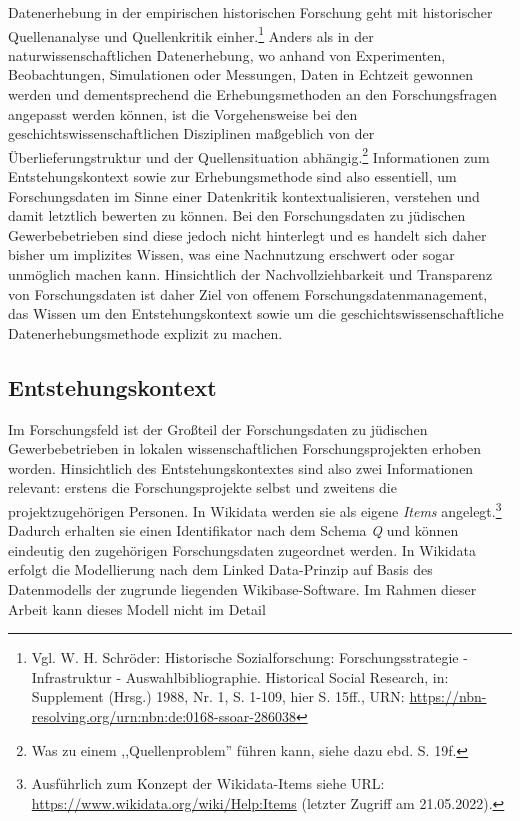 Datenerhebung in der empirischen historischen Forschung geht mit historischer Quellenanalyse und Quellenkritik einher.\footnote{Vgl. W. H. Schröder: Historische Sozialforschung: Forschungsstrategie - Infrastruktur - Auswahlbibliographie.
Historical Social Research, in: Supplement (Hrsg.) 1988, Nr. 1, S. 1-109, hier S. 15ff., URN: \url{https://nbn-resolving.org/urn:nbn:de:0168-ssoar-286038}
} Anders als in der naturwissenschaftlichen Datenerhebung, wo anhand von Experimenten, Beobachtungen, Simulationen oder Messungen, Daten in Echtzeit gewonnen werden und dementsprechend die Erhebungsmethoden an den Forschungsfragen angepasst werden können, ist die Vorgehensweise bei den geschichtswissenschaftlichen Disziplinen maßgeblich von der Überlieferungstruktur und der Quellensituation abhängig.\footnote{Was zu einem ,,Quellenproblem'' führen kann, siehe dazu ebd. S. 19f.} Informationen zum Entstehungskontext sowie zur Erhebungsmethode sind also essentiell, um Forschungsdaten im Sinne einer Datenkritik kontextualisieren, verstehen und damit letztlich bewerten zu können. Bei den Forschungsdaten zu jüdischen Gewerbebetrieben sind diese jedoch nicht hinterlegt und es handelt sich daher bisher um implizites Wissen, was eine Nachnutzung erschwert oder sogar unmöglich machen kann. Hinsichtlich der Nachvollziehbarkeit und Transparenz von Forschungsdaten ist daher Ziel von offenem Forschungsdatenmanagement, das Wissen um den Entstehungskontext sowie um die geschichtswissenschaftliche Datenerhebungsmethode explizit zu machen. 

\subsection{Entstehungskontext}

Im Forschungsfeld ist der Großteil der Forschungsdaten zu jüdischen Gewerbebetrieben in lokalen wissenschaftlichen Forschungsprojekten erhoben worden. Hinsichtlich des Entstehungskontextes sind also zwei Informationen relevant: erstens die Forschungsprojekte selbst und zweitens die projektzugehörigen Personen. In Wikidata werden sie als eigene \textit{Items} angelegt.\footnote{Ausführlich zum Konzept der Wikidata-Items siehe URL: \url{https://www.wikidata.org/wiki/Help:Items} (letzter Zugriff am 21.05.2022).} Dadurch erhalten sie einen Identifikator nach dem Schema \textit{Q} und können eindeutig den zugehörigen Forschungsdaten zugeordnet werden. In Wikidata erfolgt die Modellierung nach dem Linked Data-Prinzip auf Basis des Datenmodells der zugrunde liegenden Wikibase-Software. Im Rahmen dieser Arbeit kann dieses Modell nicht im Detail 


